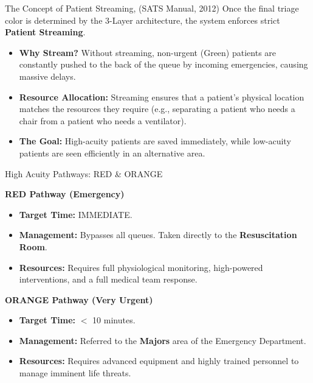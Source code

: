 \documentclass[aspectratio=169]{beamer}
\begin{document}
	\begin{frame}{The Concept of Patient Streaming, (SATS Manual, 2012)}
		Once the final triage color is determined by the 3-Layer architecture, the system enforces strict \textbf{Patient Streaming}.
		
		\vspace{0.3cm}
		\begin{itemize}
			\item \textbf{Why Stream?} Without streaming, non-urgent (Green) patients are constantly pushed to the back of the queue by incoming emergencies, causing massive delays.
			\item \textbf{Resource Allocation:} Streaming ensures that a patient's physical location matches the resources they require (e.g., separating a patient who needs a chair from a patient who needs a ventilator).
			\item \textbf{The Goal:} High-acuity patients are saved immediately, while low-acuity patients are seen efficiently in an alternative area.
		\end{itemize}
	\end{frame}
	
	\begin{frame}{High Acuity Pathways: RED \& ORANGE}
		\begin{block}{\textbf{RED Pathway (Emergency)}}
			\begin{itemize}
				\item \textbf{Target Time:} IMMEDIATE.
				\item \textbf{Management:} Bypasses all queues. Taken directly to the \textbf{Resuscitation Room}.
				\item \textbf{Resources:} Requires full physiological monitoring, high-powered interventions, and a full medical team response.
			\end{itemize}
		\end{block}
		
		\begin{block}{\textbf{ORANGE Pathway (Very Urgent)}}
			\begin{itemize}
				\item \textbf{Target Time:} $<$ 10 minutes.
				\item \textbf{Management:} Referred to the \textbf{Majors} area of the Emergency Department.
				\item \textbf{Resources:} Requires advanced equipment and highly trained personnel to manage imminent life threats.
			\end{itemize}
		\end{block}
	\end{frame}
	
\end{document}
